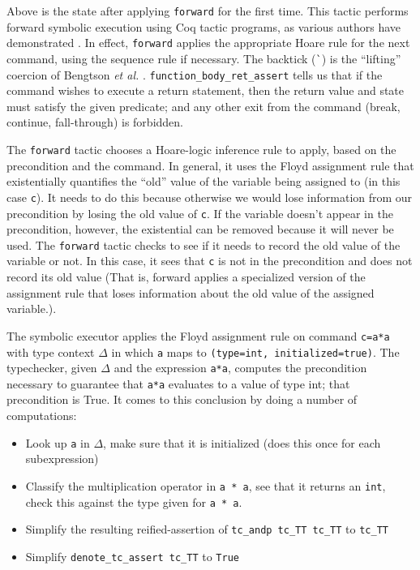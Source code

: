 \documentclass{puthesis}
\begin{document}
Above is the state after applying \lstinline|forward| for the first
time.  This tactic performs forward symbolic execution using Coq
tactic programs, as various authors have demonstrated
\cite{appel06:listmachine,chlipala11:pldi,bengtson12:Charge,mccreight09}. In
effect, \lstinline|forward| applies the appropriate Hoare rule for the
next command, using the sequence rule if necessary. The backtick
(\lstinline|`|) is the ``lifting'' coercion of Bengtson \emph{et al.}
\cite{bengtson12:Charge}.  \lstinline|function_body_ret_assert| tells
us that if the command wishes to execute a return statement, then the
return value and state must satisfy the given predicate; and any other
exit from the command (break, continue, fall-through) is forbidden.

The \lstinline|forward| tactic chooses a Hoare-logic inference rule to
apply, based on the precondition and the command. In general, it uses
the Floyd assignment rule that existentially quantifies the ``old''
value of the variable being assigned to (in this case
\lstinline|c|). It needs to do this because otherwise we would lose
information from our precondition by losing the old value of
\lstinline|c|. If the variable doesn't appear in the precondition,
however, the existential can be removed because it will never be
used. The \lstinline|forward| tactic checks to see if it needs to
record the old value of the variable or not. In this case, it sees
that \lstinline|c| is not in the precondition and does not record its
old value (That is, forward applies a specialized version of the
assignment rule that loses information about the old value of the
assigned variable.).

The symbolic executor applies the Floyd assignment rule on command
\lstinline|c=a*a| with type context $\Delta$ in which \lstinline|a|
maps to \lstinline|(type=int, initialized=true)|.  The typechecker,
given $\Delta$ and the expression \lstinline|a*a|, computes the
precondition necessary to guarantee that \lstinline|a*a| evaluates to
a value of type int; that precondition is True. It comes to this
conclusion by doing a number of computations:

\begin{itemize}
\item Look up \lstinline|a| in $\Delta$, make sure that it is initialized
  (does this once for each subexpression)
\item Classify the multiplication operator in \lstinline|a * a|, see
  that it returns an \lstinline|int|, check this against the type
  given for \lstinline|a * a|.
\item Simplify the resulting reified-assertion of 
  \lstinline|tc_andp tc_TT tc_TT| to \lstinline|tc_TT|
\item Simplify \lstinline|denote_tc_assert tc_TT| to \lstinline|True|
\end{itemize}
\end{document}
